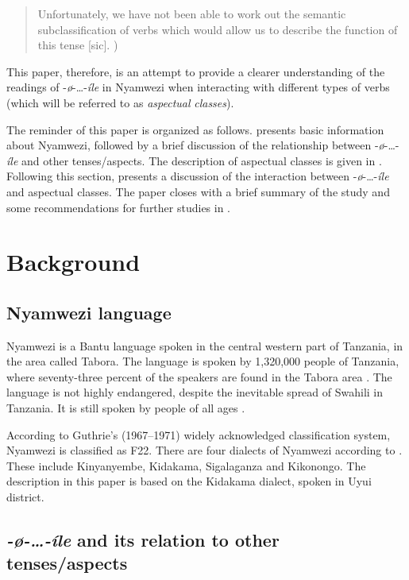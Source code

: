 \documentclass[output=paper,newtxmath,modfonts,nonflat,draftmode]{langsci/langscibook}
\begin{document}
\begin{quote}
Unfortunately, we have not been able to work out the semantic subclassification of verbs which would allow us to describe the function of this tense [sic]. \cite[126]{Maganga1992})
\end{quote}

This paper, therefore, is an attempt to provide a clearer understanding of the readings of -\textit{ø}-…-\textit{íle} in Nyamwezi when interacting with different types of verbs (which will be referred to as \textit{aspectual} \textit{classes}). 

The reminder of this paper is organized as follows.  presents basic information about Nyamwezi, followed by a brief discussion of the relationship between -\textit{ø}-…-\textit{íle} and other tenses/aspects. The description of aspectual classes is given in . Following this section,  presents a discussion of the interaction between -\textit{ø}-…-\textit{íle} and aspectual classes. The paper closes with a brief summary of the study and some recommendations for further studies in . 

 
\section{Background} 
 \label{sec:kanijo:2}
 
\subsection{Nyamwezi language} 

Nyamwezi is a Bantu language spoken in the central western part of Tanzania, in the area called Tabora. The language is spoken by 1,320,000 people of Tanzania, where seventy-three percent of the speakers are found in the Tabora area \citep{Lewis2013}. The language is not highly endangered, despite the inevitable spread of Swahili in Tanzania. It is still spoken by people of all ages \citep{Lewis2013}. 

According to Guthrie’s (1967–1971) widely acknowledged classification system, Nyamwezi is classified as F22. There are four dialects of Nyamwezi according to \citet{Masele2001}. These include Kinyanyembe, Kidakama, Sigalaganza and Kikonongo. The description in this paper is based on the Kidakama dialect, spoken in Uyui district.

\subsection{\textit{-}\textit{ø-…-íle} and its relation to other tenses/aspects}
\end{document}
